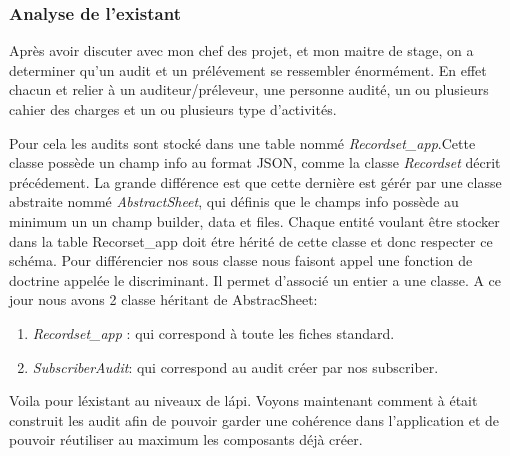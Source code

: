 \subsubsection{Analyse de l'existant}


Après avoir discuter avec mon chef des projet, et mon maitre de stage, on a determiner qu'un audit et un prélévement se ressembler énormément. En effet chacun et relier à un auditeur/préleveur, une personne audité, un ou plusieurs cahier des charges et un ou plusieurs type d'activités. 

Pour cela les audits sont stocké dans une table nommé \textit{Recordset\_app}.Cette classe possède un champ info au format JSON, comme la classe \textit{Recordset}  décrit précédement. La grande différence est que cette dernière est gérér par une classe abstraite nommé \textit{AbstractSheet}, qui définis que le champs info possède au minimum un un champ builder, data et files. Chaque entité voulant être stocker dans la table Recorset\_app doit étre hérité de cette classe et donc respecter ce schéma. Pour différencier nos sous classe nous faisont appel une fonction de doctrine appelée le discriminant. Il permet d'associé un entier a une classe. A ce jour nous avons 2 classe héritant de AbstracSheet: 
\begin{enumerate}
    \item \textit{Recordset\_app} : qui correspond à toute les fiches standard. 
    \item \textit{SubscriberAudit}: qui correspond au audit créer par nos subscriber. 
\end{enumerate}

Voila pour l\'existant au niveaux de l\'api. Voyons maintenant comment à était construit les audit afin de pouvoir garder une cohérence dans l'application et de pouvoir réutiliser au maximum les composants déjà créer. 

